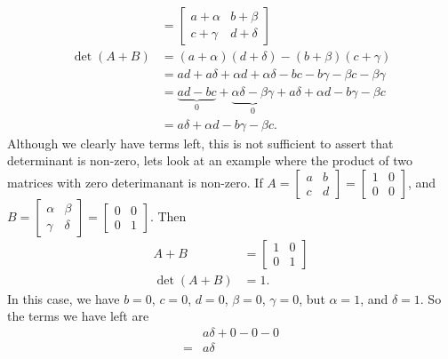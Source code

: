 \documentclass{report}
\begin{document}
\begin{itemize}
\begin{enumerate}
\begin{align*}
                                &= \begin{bmatrix} a + \alpha & b + \beta \\ c + \gamma & d + \delta\end{bmatrix} \\
                        \det(A+B) &= (a+\alpha)(d+\delta) - (b+\beta)(c+\gamma) \\
                                  &= ad + a\delta + \alpha d + \alpha\delta - bc - b\gamma - \beta c - \beta\gamma \\
                                  &=\underbrace{ad -bc}_0 + \underbrace{\alpha\delta - \beta\gamma}_0 + a\delta + \alpha d  - b\gamma - \beta c   \\
                                  &=a\delta + \alpha d  - b\gamma - \beta c
                    .\end{align*}
                    Although we clearly have terms left, this is not sufficient to assert that determinant is non-zero, lets look at an example where the product of two matrices with zero deterimanant is non-zero. If $A = \begin{bmatrix} a & b \\ c & d \end{bmatrix}  = \begin{bmatrix} 1 & 0 \\ 0 & 0 \end{bmatrix}$, and $B = \begin{bmatrix} \alpha & \beta \\ \gamma & \delta \end{bmatrix}  = \begin{bmatrix} 0 & 0 \\ 0 &  1\end{bmatrix}$. Then
                    \begin{align*}
                        A + B &= \begin{bmatrix} 1 & 0 \\0  & 1 \end{bmatrix} \\
                        \det(A+B) &= 1
                    .\end{align*}
                    In this case, we have $b=0$, $c=0$, $d=0$, $\beta = 0$, $\gamma=0$, but $\alpha = 1$, and $\delta = 1$. So the terms we have left are
                    \begin{align*}
                        &a\delta + 0 - 0 - 0 \\
                        = &a\delta

\end{align*}
\end{enumerate}
\end{itemize}
\end{document}
